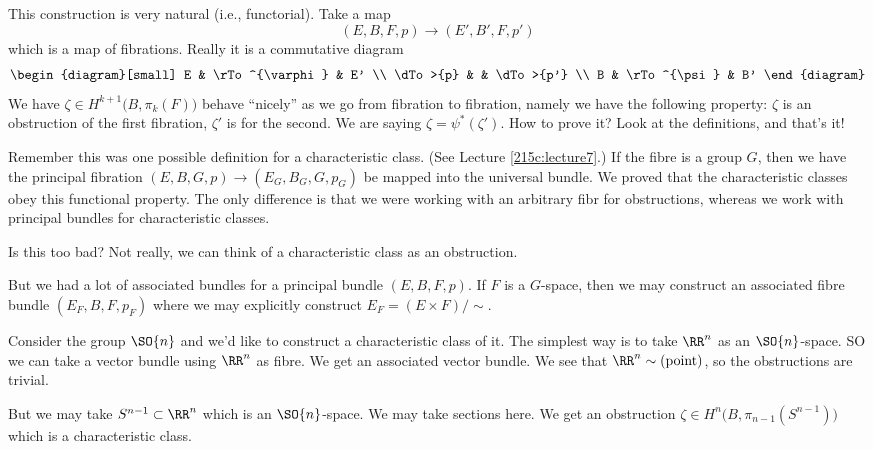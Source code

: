 This construction is very natural (i.e., functorial). Take a map 
\begin{equation*}
(E,B,F,p)\to(E',B',F,p')
\end{equation*}
which is a map of fibrations. Really it is a commutative diagram
\begin{equation}
\begin{diagram}[small]
E        & \rTo^{\varphi} & E' \\
\dTo>{p} &                & \dTo>{p'} \\
B        & \rTo^{\psi}    & B'
\end{diagram}
\end{equation}
We have $\zeta\in H^{k+1}\bigl(B,\pi_{k}(F)\bigr)$ behave
``nicely'' as we go from fibration to fibration, namely we have
the following property: $\zeta$ is an obstruction of the first
fibration, $\zeta'$ is for the second. We are saying
$\zeta=\psi^{*}(\zeta')$. How to prove it? Look at the
definitions, and that's it!

Remember this was one possible definition for a characteristic
class. (See Lecture \ref{215c:lecture7}.) If the fibre is a group
$G$, then we have the principal fibration
$(E,B,G,p)\to(E_{G},B_{G},G,p_{G})$ be mapped into the universal
bundle. We proved that the characteristic classes obey this
functional property. The only difference is that we were working
with an arbitrary fibr for obstructions, whereas we work with
principal bundles for characteristic classes.

Is this too bad? Not really, we can think of a characteristic
class as an obstruction.

But we had a lot of associated bundles for a principal bundle
$(E,B,F,p)$. If $F$ is a $G$-space, then we may construct an
associated fibre bundle $(E_{F},B,F,p_{F})$ where we may
explicitly construct $E_{F}=(E\times F)/\sim$.

Consider the group $\SO{n}$ and we'd like to construct a
characteristic class of it. The simplest way is to take $\RR^n$
as an $\SO{n}$-space. SO we can take a vector bundle using
$\RR^n$ as fibre. We get an associated vector bundle. We see that
$\RR^n\homotopic(\mbox{point})$, so the obstructions are trivial.

But we may take $S^{n-1}\subset\RR^{n}$ which is an
$\SO{n}$-space. We may take sections here. We get an obstruction
$\zeta\in H^{n}\bigl(B,\pi_{n-1}(S^{n-1})\bigr)$ which is a
characteristic class.
